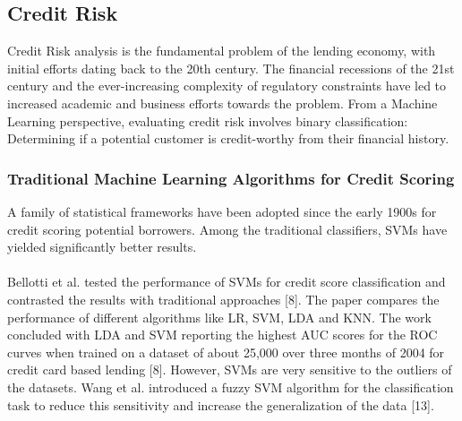 \documentclass[a4paper, 12pt]{article}
\begin{document}
\vskip 0.2in
\subsection{Credit Risk}
Credit Risk analysis is the fundamental problem of the lending economy, with initial efforts dating back to the 20th century. The financial recessions of the 21st century and the ever-increasing complexity of regulatory constraints have led to increased academic and business efforts towards the problem. From a Machine Learning perspective, evaluating credit risk involves binary classification: Determining if a potential customer is credit-worthy from their financial history.

\vskip 0.2in
\subsubsection{Traditional Machine Learning Algorithms for Credit Scoring}
\noindent A family of statistical frameworks have been adopted since the early 1900s for credit scoring potential borrowers. Among the traditional classifiers, SVMs have yielded significantly better results.
\\
\\
\noindent Bellotti et al. tested the performance of SVMs for credit score classification and contrasted the results with traditional approaches [8]. The paper compares the performance of different algorithms like LR, SVM, LDA and KNN. The work concluded with LDA and SVM reporting the highest AUC scores for the ROC curves when trained on a dataset of about 25,000 over three months of 2004 for credit card based lending [8]. However, SVMs are very sensitive to the outliers of the datasets. Wang et al. introduced a fuzzy SVM algorithm for the classification task to reduce this sensitivity and increase the generalization of the data [13].

\vskip 0.2in
\end{document}
